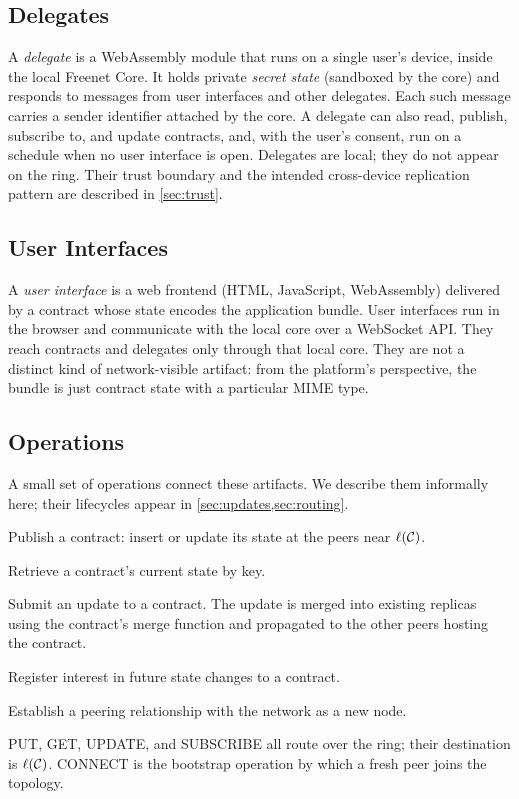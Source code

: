 \subsection{Delegates}

A \emph{delegate} is a WebAssembly module that runs on a single user's device, inside the local Freenet Core. It holds private \emph{secret state} (sandboxed by the core) and responds to messages from user interfaces and other delegates. Each such message carries a sender identifier attached by the core. A delegate can also read, publish, subscribe to, and update contracts, and, with the user's consent, run on a schedule when no user interface is open. Delegates are local; they do not appear on the ring. Their trust boundary and the intended cross-device replication pattern are described in \cref{sec:trust}.

\subsection{User Interfaces}

A \emph{user interface} is a web frontend (HTML, JavaScript, WebAssembly) delivered by a contract whose state encodes the application bundle. User interfaces run in the browser and communicate with the local core over a WebSocket API. They reach contracts and delegates only through that local core. They are not a distinct kind of network-visible artifact: from the platform's perspective, the bundle is just contract state with a particular MIME type.



\subsection{Operations}

A small set of operations connect these artifacts. We describe them informally here; their lifecycles appear in \cref{sec:updates,sec:routing}.

\begin{description}[leftmargin=1.4em, style=nextline, itemsep=2pt]
  \item[\textsf{PUT}] Publish a contract: insert or update its state at the peers near $\ell(\mathcal{C})$.
  \item[\textsf{GET}] Retrieve a contract's current state by key.
  \item[\textsf{UPDATE}] Submit an update to a contract. The update is merged into existing replicas using the contract's merge function and propagated to the other peers hosting the contract.
  \item[\textsf{SUBSCRIBE}] Register interest in future state changes to a contract.
  \item[\textsf{CONNECT}] Establish a peering relationship with the network as a new node.
\end{description}

\textsf{PUT}, \textsf{GET}, \textsf{UPDATE}, and \textsf{SUBSCRIBE} all route over the ring; their destination is $\ell(\mathcal{C})$. \textsf{CONNECT} is the bootstrap operation by which a fresh peer joins the topology.

